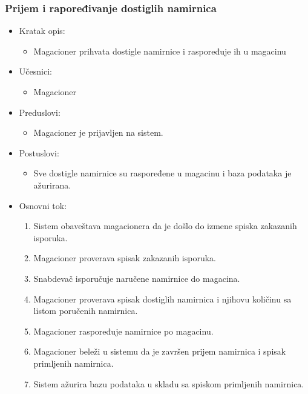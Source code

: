 
\subsubsection{Prijem i rapoređivanje dostiglih namirnica}
	\begin{itemize}
		\item{Kratak opis:} 
		\begin{itemize}
			\item{Magacioner prihvata dostigle namirnice i raspoređuje ih u magacinu}
		\end{itemize}
		\item{Učesnici:} 
		\begin{itemize}
			\item{Magacioner}
	
		\end{itemize}		
		
		\item{Preduslovi:}
		\begin{itemize}
			\item{Magacioner je prijavljen na sistem.}
		\end{itemize}
		
		\item{Postuslovi:}
		\begin{itemize}
			\item{Sve dostigle namirnice su raspoređene u magacinu i baza podataka je ažurirana.}
		\end{itemize}
		
		\item{Osnovni tok:}
		\begin{enumerate}
			\item{Sistem obaveštava magacionera da je došlo do izmene spiska zakazanih isporuka.}
			\item{Magacioner proverava spisak zakazanih isporuka.}
			\item{Snabdevač isporučuje naručene namirnice do magacina.}
			\item{Magacioner proverava spisak dostiglih namirnica i njihovu količinu sa listom poručenih namirnica.}
			\item{Magacioner raspoređuje namirnice po magacinu.}
			\item{Magacioner beleži u sistemu da je završen prijem namirnica i spisak primljenih namirnica.}
			\item{Sistem ažurira bazu podataka u skladu sa spiskom primljenih namirnica.}
		\end{enumerate}
		

\end{itemize}
